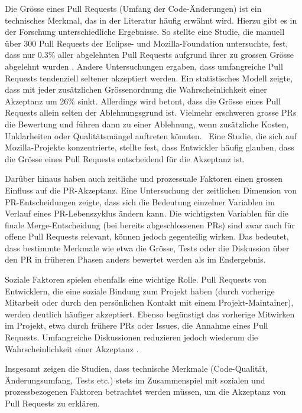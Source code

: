 Die Grösse eines Pull Requests (Umfang der Code-Änderungen) ist ein technisches Merkmal, das in der Literatur häufig erwähnt wird. Hierzu gibt es in der Forschung unterschiedliche Ergebnisse. So stellte eine Studie, die manuell über 300 Pull Requests der Eclipse- und Mozilla-Foundation untersuchte, fest, dass nur 0.3\% aller abgelehnten Pull Requests aufgrund ihrer zu grossen Grösse abgelehnt wurden \parencite{tao_writing_2014}. Andere Untersuchungen ergaben, dass umfangreiche Pull Requests tendenziell seltener akzeptiert werden. Ein statistisches Modell zeigte, dass mit jeder zusätzlichen Grössenordnung die Wahrscheinlichkeit einer Akzeptanz um 26\% sinkt. Allerdings wird betont, dass die Grösse eines Pull Requests allein selten der Ablehnungsgrund ist. Vielmehr erschweren grosse PRs die Bewertung und führen dann zu einer Ablehnung, wenn zusätzliche Kosten, Unklarheiten oder Qualitätsmängel auftreten könnten. \ Eine Studie, die sich auf Mozilla-Projekte konzentrierte, stellte fest, dass Entwickler häufig glauben, dass die Grösse eines Pull Requests entscheidend für die Akzeptanz ist. \parencite{tsay_influence_2014}

Darüber hinaus haben auch zeitliche und prozessuale Faktoren einen grossen Einfluss auf die PR-Akzeptanz. Eine Untersuchung der zeitlichen Dimension von PR-Entscheidungen zeigte, dass sich die Bedeutung einzelner Variablen im Verlauf eines PR-Lebenszyklus ändern kann. Die wichtigsten Variablen für die finale Merge-Entscheidung (bei bereits abgeschlossenen PRs) sind zwar auch für offene Pull Requests relevant, können jedoch gegenteilig wirken. Das bedeutet, dass bestimmte Merkmale wie etwa die Grösse, Tests oder die Diskussion über den PR in früheren Phasen anders bewertet werden als im Endergebnis. \parencite{west_temporal_2023}

Soziale Faktoren spielen ebenfalls eine wichtige Rolle. Pull Requests von Entwicklern, die eine soziale Bindung zum Projekt haben (durch vorherige Mitarbeit oder durch den persönlichen Kontakt mit einem Projekt-Maintainer), werden deutlich häufiger akzeptiert. Ebenso begünstigt das vorherige Mitwirken im Projekt, etwa durch frühere PRs oder Issues, die Annahme eines Pull Requests. Umfangreiche Diskussionen reduzieren jedoch wiederum die Wahrscheinlichkeit einer Akzeptanz \parencite{tsay_influence_2014}.

Insgesamt zeigen die Studien, dass technische Merkmale (Code-Qualität, Änderungsumfang, Tests etc.) stets im Zusammenspiel mit sozialen und prozessbezogenen Faktoren betrachtet werden müssen, um die Akzeptanz von Pull Requests zu erklären.